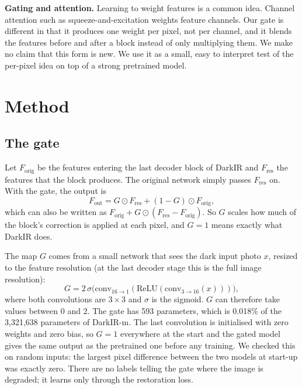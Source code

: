\documentclass[conference]{IEEEtran}
\begin{document}
\textbf{Gating and attention.} Learning to weight features is a common idea. Channel attention such as squeeze-and-excitation \cite{senet} weights feature channels. Our gate is different in that it produces one weight per pixel, not per channel, and it blends the features before and after a block instead of only multiplying them. We make no claim that this form is new. We use it as a small, easy to interpret test of the per-pixel idea on top of a strong pretrained model.

\section{Method}
\subsection{The gate}
Let $F_{\text{orig}}$ be the features entering the last decoder block of DarkIR and $F_{\text{res}}$ the features that the block produces. The original network simply passes $F_{\text{res}}$ on. With the gate, the output is
\begin{equation}
F_{\text{out}} = G \odot F_{\text{res}} + (1-G)\odot F_{\text{orig}},
\label{eq:blend}
\end{equation}
which can also be written as $F_{\text{orig}} + G \odot (F_{\text{res}} - F_{\text{orig}})$. So $G$ scales how much of the block's correction is applied at each pixel, and $G=1$ means exactly what DarkIR does.

The map $G$ comes from a small network that sees the dark input photo $x$, resized to the feature resolution (at the last decoder stage this is the full image resolution):
\begin{equation}
G = 2\,\sigma\big(\mathrm{conv}_{16\to1}(\mathrm{ReLU}(\mathrm{conv}_{3\to16}(x)))\big),
\label{eq:gate}
\end{equation}
where both convolutions are $3\times3$ and $\sigma$ is the sigmoid. $G$ can therefore take values between 0 and 2. The gate has 593 parameters, which is 0.018\% of the 3{,}321{,}638 parameters of DarkIR-m. The last convolution is initialised with zero weights and zero bias, so $G=1$ everywhere at the start and the gated model gives the same output as the pretrained one before any training. We checked this on random inputs: the largest pixel difference between the two models at start-up was exactly zero. There are no labels telling the gate where the image is degraded; it learns only through the restoration loss.
\end{document}
